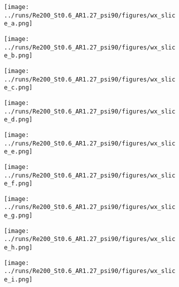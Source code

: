 \begin{figure}
  \centering
  \begin{subfigure}[t]{0.24\textwidth}
    \centering
    \texttt{[image: ../runs/Re200\_St0.6\_AR1.27\_psi90/figures/wx\_slice\_a.png]}
    \caption{}
  \end{subfigure}
  \begin{subfigure}[t]{0.24\textwidth}
    \centering
    \texttt{[image: ../runs/Re200\_St0.6\_AR1.27\_psi90/figures/wx\_slice\_b.png]}
    \caption{}
  \end{subfigure}
  \begin{subfigure}[t]{0.24\textwidth}
    \centering
    \texttt{[image: ../runs/Re200\_St0.6\_AR1.27\_psi90/figures/wx\_slice\_c.png]}
    \caption{}
  \end{subfigure}
  \begin{subfigure}[t]{0.24\textwidth}
    \centering
    \texttt{[image: ../runs/Re200\_St0.6\_AR1.27\_psi90/figures/wx\_slice\_d.png]}
    \caption{}
  \end{subfigure}
  \vspace{0.5cm}
  \begin{subfigure}[t]{0.24\textwidth}
    \centering
    \texttt{[image: ../runs/Re200\_St0.6\_AR1.27\_psi90/figures/wx\_slice\_e.png]}
    \caption{}
  \end{subfigure}
  \begin{subfigure}[t]{0.24\textwidth}
    \centering
    \texttt{[image: ../runs/Re200\_St0.6\_AR1.27\_psi90/figures/wx\_slice\_f.png]}
    \caption{}
  \end{subfigure}
  \begin{subfigure}[t]{0.24\textwidth}
    \centering
    \texttt{[image: ../runs/Re200\_St0.6\_AR1.27\_psi90/figures/wx\_slice\_g.png]}
    \caption{}
  \end{subfigure}
  \begin{subfigure}[t]{0.24\textwidth}
    \centering
    \texttt{[image: ../runs/Re200\_St0.6\_AR1.27\_psi90/figures/wx\_slice\_h.png]}
    \caption{}
  \end{subfigure}
  \vspace{0.5cm}
  \begin{subfigure}[t]{0.24\textwidth}
    \centering
    \texttt{[image: ../runs/Re200\_St0.6\_AR1.27\_psi90/figures/wx\_slice\_i.png]}
    \caption{}
  \end{subfigure}
  \begin{subfigure}[t]{0.24\textwidth}

\end{subfigure}
\end{figure}
